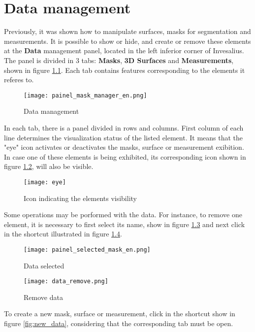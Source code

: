 \chapter{Data management}

Previously, it was shown how to manipulate surfaces, masks for segmentation and measurements. It is possible to show or
hide, and create or remove these elements at the \textbf{Data} management panel, located in the left inferior corner of
Invesalius. The panel is divided in 3 tabs: \textbf{Masks}, \textbf{3D Surfaces} and \textbf{Measurements}, shown in
figure \ref{fig:volumetric_data}. Each tab contains features corresponding to the elements it referes to.

\begin{figure}[!htb]
\centering
\texttt{[image: painel\_mask\_manager\_en.png]}
\caption{Data management}
\label{fig:volumetric_data}
\end{figure}

In each tab, there is a panel divided in rows and columns. First column of each line determines the visualization status
of the listed element. It means that the "eye" icon activates or deactivates the masks, surface or measurement exibition.
In case one of these elements is being exhibited, its corresponding icon shown in figure \ref{fig:disable_mask}, will
also be visible.

\newpage

\begin{figure}[!htb]
\centering
\texttt{[image: eye]}
\caption{Icon indicating the elements visibility}
\label{fig:disable_mask}
\end{figure}

Some operations may be porformed with the data. For instance, to remove one element, it is necessary to first select
its name, show in figure \ref{fig:selected_mask} and next click in the shortcut illustrated in
figure \ref{fig:delete_data}.

\begin{figure}[!htb]
\centering
\texttt{[image: painel\_selected\_mask\_en.png]}
\caption{Data selected}
\label{fig:selected_mask}
\end{figure}


\begin{figure}[!htb]
\centering
\texttt{[image: data\_remove.png]}
\caption{Remove data}
\label{fig:delete_data}
\end{figure}

To create a new mask, surface or measurement, click in the shortcut show in figure \ref{fig:new_data}, considering that
the corresponding tab must be open.

